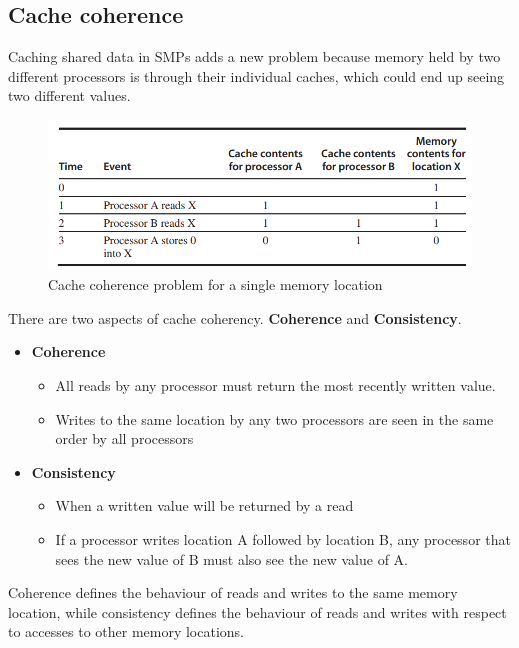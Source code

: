 \documentclass[11pt]{article}
\begin{document}
\subsection{Cache coherence}
Caching shared data in SMPs adds a new problem because memory held by two different processors is through their individual caches, which could end up seeing two different values. 
\begin{figure}[H]
\centering
\includegraphics[width=1\textwidth, keepaspectratio]{imgs/cache-coherence.png}
\caption{Cache coherence problem for a single memory location}
\end{figure}
\noindent 
There are two aspects of cache coherency. \textbf{Coherence} and \textbf{Consistency}.
\begin{itemize}
\item \textbf{Coherence}
	\begin{itemize}
	\item All reads by any processor must return the most recently written value.
	\item Writes to the same location by any two processors are seen in the same order by all processors
	\end{itemize}
\item \textbf{Consistency}
\begin{itemize}
\item When a written value will be returned by a read
\item If a processor writes location A followed by location B, any processor that sees the new value of B must also see the new value of A. 
\end{itemize} 
\end{itemize}
Coherence defines the behaviour of reads and writes to the same memory location, while consistency defines the behaviour of reads and writes with respect to accesses to other memory locations. 
\end{document}
